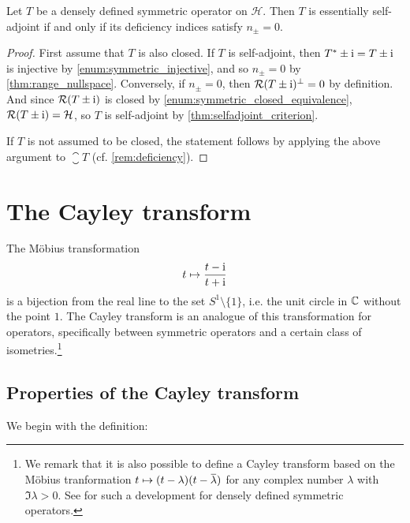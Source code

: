 \documentclass[article, a4paper, 11pt, oneside]{memoir}
\makeatletter
\numberwithin{equation}{chapter}
\newcommand{\calH}{\mathcal{H}}
\newcommand{\range}{\mathcal{R}}
\theoremstyle{myexample}
\theoremstyle{myexample}
\theoremstyle{myexamplebreak}
\theoremstyle{myexamplebreak}
\theoremstyle{nonumberplain}
\newtheorem{proof}{\protect\@proof}
\theoremstyle{MyNonumberplain}
\newcommand{\@proof}{}
\renewcommand{\@proof}{Proof}%
\renewcommand{\@proof}{Bevis}%
\makeatother
\begin{document}
\begin{proposition}
    \label{thm:selfadjoint_deficiency}
    Let $T$ be a densely defined symmetric operator on $\calH$. Then $T$ is essentially self-adjoint if and only if its deficiency indices satisfy $n_\pm = 0$.
\end{proposition}

\begin{proof}
    First assume that $T$ is also closed. If $T$ is self-adjoint, then $T^* \pm \operatorname{i} = T \pm \operatorname{i}$ is injective by \cref{enum:symmetric_injective}, and so $n_\pm = 0$ by \cref{thm:range_nullspace}. Conversely, if $n_\pm = 0$, then $\range(T \pm \iu)^\perp = 0$ by definition. And since $\range(T \pm \iu)$ is closed by \cref{enum:symmetric_closed_equivalence}, $\range(T \pm \iu) = \calH$, so $T$ is self-adjoint by \cref{thm:selfadjoint_criterion}.
    
    If $T$ is not assumed to be closed, the statement follows by applying the above argument to $\closure{T}$ (cf. \cref{rem:deficiency}).
\end{proof}



\chapter{The Cayley transform}

The Möbius transformation
%
\begin{equation}
    \label{eq:mobius}
    t \mapsto \frac{t - \operatorname{i}}{t + \operatorname{i}}
\end{equation}
%
is a bijection from the real line to the set $S^1 \setminus \{1\}$, i.e. the unit circle in $\mathbb{C}$ without the point $1$. The Cayley transform is an analogue of this transformation for operators, specifically between symmetric operators and a certain class of isometries.\footnote{We remark that it is also possible to define a Cayley transform based on the Möbius tranformation $t \mapsto (t - \lambda)(t - \conj{\lambda})$ for any complex number $\lambda$ with $\Im \lambda > 0$. See \textcite[Section~13.1]{schmudgen2012} for such a development for densely defined symmetric operators.}


\section{Properties of the Cayley transform}

We begin with the definition:
\end{document}
